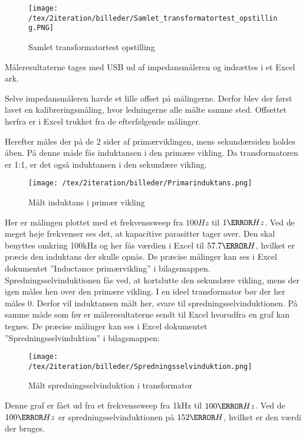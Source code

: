 \begin{figure}[H]
	\center
	\texttt{[image: /tex/2iteration/billeder/Samlet\_transformatortest\_opstilling.PNG]}
	\caption{Samlet transformatortest opstilling}
	\label{fig: Transopstilling}
\end{figure}

\noindent Måleresultaterne tages med USB ud af impedansmåleren og indsættes i et Excel ark.  

\noindent Selve impedansmåleren havde et lille offset på målingerne. Derfor blev der først lavet en kalibreringsmåling, hvor ledningerne alle målte samme sted. Offsettet herfra er i Excel trukket fra de efterfølgende målinger.    

\noindent Herefter måles der på de 2 sider af primærviklingen, mens sekundærsiden holdes åben. På denne måde fås induktansen i den primære vikling. Da transformatoren er 1:1, er det også induktansen i den sekundære vikling. 
\begin{figure}[H]
	\center
	\texttt{[image: /tex/2iteration/billeder/Primarinduktans.png]}
	\caption{Målt induktans i primær vikling}
	\label{fig: Primarinduktans}
\end{figure}
\noindent Her er målingen plottet med et frekvenssweep fra $100Hz$ til $1\mega Hz$. Ved de meget høje frekvenser ses det, at kapacitive parasitter tager over. Den skal benyttes omkring 100kHz og her fås værdien i Excel til $57.7\micro H$, hvilket er præcis den induktans der skulle opnås. De præcise målinger kan ses i Excel dokumentet ”Inductance primærvikling” i bilagsmappen. 
Spredningsselvinduktionen fås ved, at kortslutte den sekundære vikling, mens der igen måles hen over den primære vikling. I en ideel transformator bør der her måles 0. Derfor vil induktansen målt her, svare til spredningsselvinduktionen. På samme måde som før er måleresultaterne sendt til Excel hvorudfra en graf kan tegnes. De præcise målinger kan ses i Excel dokumentet ”Spredningsselvinduktion” i bilagsmappen:
\begin{figure}[H]
	\center
	\texttt{[image: /tex/2iteration/billeder/Spredningsselvinduktion.png]}
	\caption{Målt spredningsselvinduktion i transformator}
	\label{fig: leakageinductance}
\end{figure}
\noindent Denne graf er fået ud fra et frekvenssweep fra 1kHz til $100\kilo Hz$. Ved de $100\kilo Hz$ er spredningsselvinduktionen på $152\nano H$, hvilket er den værdi der bruges. 





